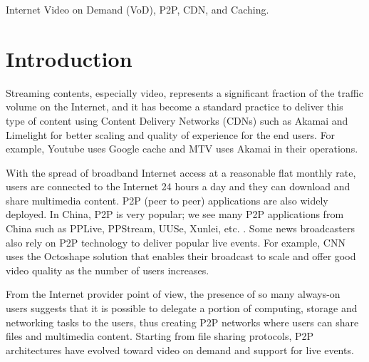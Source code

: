 \documentclass[10pt,final,journal,a4paper]{IEEEtran}
\begin{document}
\begin{IEEEkeywords}
Internet Video on Demand (VoD), P2P, CDN, and Caching.
\end{IEEEkeywords}



\section{Introduction}
Streaming contents, especially video, represents a significant fraction of the traffic volume on the Internet, and it has become a standard practice to deliver this type of content using Content Delivery Networks (CDNs) such as Akamai and Limelight for better scaling and quality of experience for the end users. 
For example, Youtube uses Google cache and MTV uses Akamai in their operations.

With the spread of broadband Internet access at a reasonable flat monthly rate, users are connected to the Internet 24 hours a day and they can download and share multimedia content. P2P (peer to peer) applications are also widely deployed. 
In China, P2P is very popular; we see many P2P applications from China such as PPLive, PPStream, UUSe, Xunlei, etc. \cite{Vu:2010:UOC:1865106.1865115}. 
Some news broadcasters also rely on P2P technology to deliver popular live events. 
For example, CNN uses the Octoshape \cite{octoshape} solution that enables their broadcast to scale and offer good video quality as the number of users increases.

From the Internet provider point of view, the presence of so many always-on users suggests that it is possible to delegate a portion of computing, storage and networking tasks to the users, thus creating P2P networks where users can share files and multimedia content. 
Starting from file sharing protocols, P2P architectures have evolved toward video on demand and support for live events.

\end{document}
